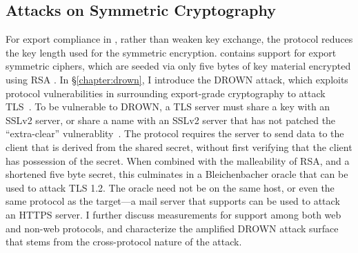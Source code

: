 \subsection{Attacks on Symmetric Cryptography}

For export compliance in \ssltwo, rather than weaken key exchange, the
protocol reduces the key length used for the symmetric encryption.
\ssltwo contains support for export symmetric ciphers, which are seeded via
only five bytes of key material encrypted using RSA \PKCS. In
\S\ref{chapter:drown}, I introduce the DROWN attack, which exploits protocol
vulnerabilities in \ssltwo surrounding export-grade cryptography to attack
TLS~\cite{drown-2016}. To be vulnerable to DROWN, a TLS server must share a
key with an SSLv2 server, or share a name with an SSLv2 server that has not
patched the ``extra-clear'' vulnerablity~\cite{drown-2016,cve-2016-0701}.
The \ssltwo protocol requires the server to send data to the client that is
derived from the shared secret, without first verifying that the client has
possession of the secret. When combined with the malleability of RSA, and a
shortened five byte secret, this culminates in a Bleichenbacher oracle that
can be used to attack TLS 1.2. The \ssltwo oracle need not be on the same
host, or even the same protocol as the target---a mail server that supports
\starttls can be used to attack an HTTPS server. I further discuss
measurements for \ssltwo support among both web and non-web protocols, and
characterize the amplified DROWN attack surface that stems from the
cross-protocol nature of the attack.

%
%

